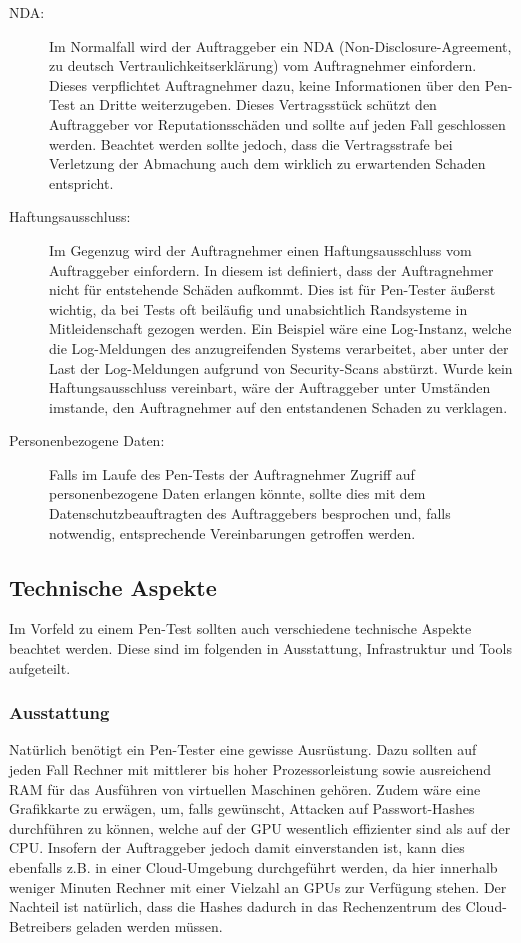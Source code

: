 \begin{description}
	\item[NDA: ] Im Normalfall wird der Auftraggeber ein NDA (Non-Disclosure-Agreement, zu deutsch Vertraulichkeitserklärung) vom Auftragnehmer einfordern. Dieses verpflichtet Auftragnehmer dazu, keine Informationen über den Pen-Test an Dritte weiterzugeben. Dieses Vertragsstück schützt den Auftraggeber vor Reputationsschäden und sollte auf jeden Fall geschlossen werden. Beachtet werden sollte jedoch, dass die Vertragsstrafe bei Verletzung der Abmachung auch dem wirklich zu erwartenden Schaden entspricht.
	
	\item[Haftungsausschluss: ] Im Gegenzug wird der Auftragnehmer einen Haftungsausschluss vom Auftraggeber einfordern. In diesem ist definiert, dass der Auftragnehmer nicht für entstehende Schäden aufkommt. Dies ist für Pen-Tester äußerst wichtig, da bei Tests oft beiläufig und unabsichtlich Randsysteme in Mitleidenschaft gezogen werden. Ein Beispiel wäre eine Log-Instanz, welche die Log-Meldungen des anzugreifenden Systems verarbeitet, aber unter der Last der Log-Meldungen aufgrund von Security-Scans abstürzt. Wurde kein Haftungsausschluss vereinbart, wäre der Auftraggeber unter Umständen imstande, den Auftragnehmer auf den entstandenen Schaden zu verklagen. 
	
	\item[Personenbezogene Daten: ] Falls im Laufe des Pen-Tests der Auftragnehmer Zugriff auf personenbezogene Daten erlangen könnte, sollte dies mit dem Datenschutzbeauftragten des Auftraggebers besprochen und, falls notwendig, entsprechende Vereinbarungen getroffen werden.
\end{description}

	\newpage
	\subsection{Technische Aspekte}
	Im Vorfeld zu einem Pen-Test sollten auch verschiedene technische Aspekte beachtet werden. Diese sind im folgenden in Ausstattung, Infrastruktur und Tools aufgeteilt.
	
		\subsubsection{Ausstattung}
		Natürlich benötigt ein Pen-Tester eine gewisse Ausrüstung. Dazu sollten auf jeden Fall Rechner mit mittlerer bis hoher Prozessorleistung sowie ausreichend RAM für das Ausführen von virtuellen Maschinen gehören. Zudem wäre eine Grafikkarte zu erwägen, um, falls gewünscht, Attacken auf Passwort-Hashes durchführen zu können, welche auf der GPU wesentlich effizienter sind als auf der CPU. Insofern der Auftraggeber jedoch damit einverstanden ist, kann dies ebenfalls z.B. in einer Cloud-Umgebung durchgeführt werden, da hier innerhalb weniger Minuten Rechner mit einer Vielzahl an GPUs zur Verfügung stehen. Der Nachteil ist natürlich, dass die Hashes dadurch in das Rechenzentrum des Cloud-Betreibers geladen werden müssen.\\
		
